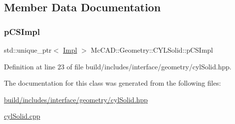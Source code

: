 \subsection{Member Data Documentation}
\mbox{\label{classMcCAD_1_1Geometry_1_1CYLSolid_ae0aadc232a3721a7246cbfa0348c7c0b}} 
\subsubsection{\texorpdfstring{p\+C\+S\+Impl}{pCSImpl}}
{\footnotesize\ttfamily std\+::unique\+\_\+ptr$<$ \hyperlink{classMcCAD_1_1Geometry_1_1CYLSolid_1_1Impl}{Impl} $>$ Mc\+C\+A\+D\+::\+Geometry\+::\+C\+Y\+L\+Solid\+::p\+C\+S\+Impl\hspace{0.3cm}{\ttfamily [private]}}



Definition at line 23 of file build/includes/interface/geometry/cyl\+Solid.\+hpp.



The documentation for this class was generated from the following files\+:\begin{DoxyCompactItemize}
\item 
\hyperlink{build_2includes_2interface_2geometry_2cylSolid_8hpp}{build/includes/interface/geometry/cyl\+Solid.\+hpp}\item 
\hyperlink{cylSolid_8cpp}{cyl\+Solid.\+cpp}\end{DoxyCompactItemize}
